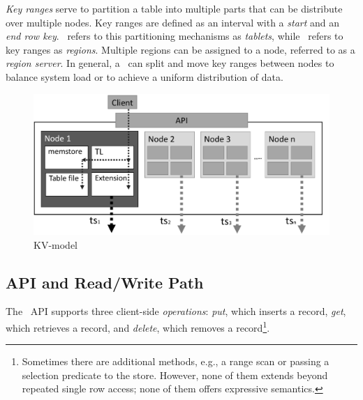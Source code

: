 \textit{Key ranges} serve to partition a table into multiple parts
that can be distribute over multiple nodes.  Key ranges are defined as
an interval with a \textit{start} and an \textit{end row key}.
\PN\ refers to this partitioning mechanisms as \textit{tablets}, while
\HB\ refers to key ranges as \textit{regions}. Multiple regions can be
assigned to a node, referred to as a \textit{region server}.  In
general, a \KVS\ can split and move key ranges between nodes to
balance system load or to achieve a uniform distribution of data.


%
%

\begin{figure} 
	\centering 
	\includegraphics[width=\linewidth]{figures/KVModel} 
	\vspace{-5mm}	
	\caption{KV-model} 
	 \vspace{-4mm}
	\label{fig:kv_model} 
\end{figure} 

\subsection{API and Read/Write Path}

The \KVS\ API supports three client-side \textit{operations}:
\textit{put}, which inserts a record, \textit{get}, which retrieves a
record, and \textit{delete}, which removes a record\footnote{Sometimes
  there are additional methods, e.g., a range scan or passing a
  selection predicate to the store. However, none of them extends
  beyond repeated single row access; none of them offers expressive
  semantics.}.

